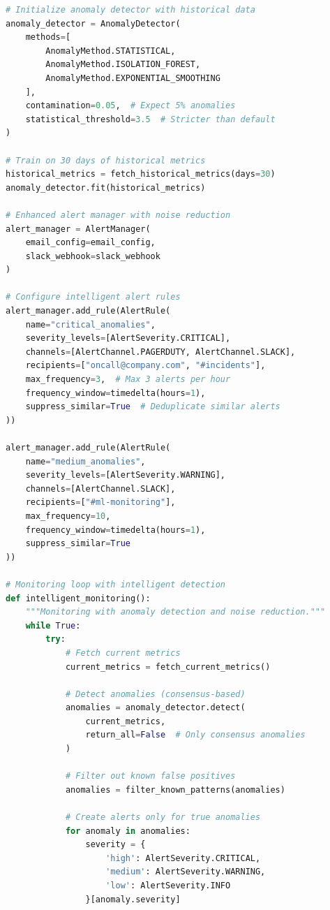 \begin{lstlisting}[language=Python, caption={Intelligent Alert System Implementation}]
# Initialize anomaly detector with historical data
anomaly_detector = AnomalyDetector(
    methods=[
        AnomalyMethod.STATISTICAL,
        AnomalyMethod.ISOLATION_FOREST,
        AnomalyMethod.EXPONENTIAL_SMOOTHING
    ],
    contamination=0.05,  # Expect 5% anomalies
    statistical_threshold=3.5  # Stricter than default
)

# Train on 30 days of historical metrics
historical_metrics = fetch_historical_metrics(days=30)
anomaly_detector.fit(historical_metrics)

# Enhanced alert manager with noise reduction
alert_manager = AlertManager(
    email_config=email_config,
    slack_webhook=slack_webhook
)

# Configure intelligent alert rules
alert_manager.add_rule(AlertRule(
    name="critical_anomalies",
    severity_levels=[AlertSeverity.CRITICAL],
    channels=[AlertChannel.PAGERDUTY, AlertChannel.SLACK],
    recipients=["oncall@company.com", "#incidents"],
    max_frequency=3,  # Max 3 alerts per hour
    frequency_window=timedelta(hours=1),
    suppress_similar=True  # Deduplicate similar alerts
))

alert_manager.add_rule(AlertRule(
    name="medium_anomalies",
    severity_levels=[AlertSeverity.WARNING],
    channels=[AlertChannel.SLACK],
    recipients=["#ml-monitoring"],
    max_frequency=10,
    frequency_window=timedelta(hours=1),
    suppress_similar=True
))

# Monitoring loop with intelligent detection
def intelligent_monitoring():
    """Monitoring with anomaly detection and noise reduction."""
    while True:
        try:
            # Fetch current metrics
            current_metrics = fetch_current_metrics()

            # Detect anomalies (consensus-based)
            anomalies = anomaly_detector.detect(
                current_metrics,
                return_all=False  # Only consensus anomalies
            )

            # Filter out known false positives
            anomalies = filter_known_patterns(anomalies)

            # Create alerts only for true anomalies
            for anomaly in anomalies:
                severity = {
                    'high': AlertSeverity.CRITICAL,
                    'medium': AlertSeverity.WARNING,
                    'low': AlertSeverity.INFO
                }[anomaly.severity]


\end{lstlisting}
